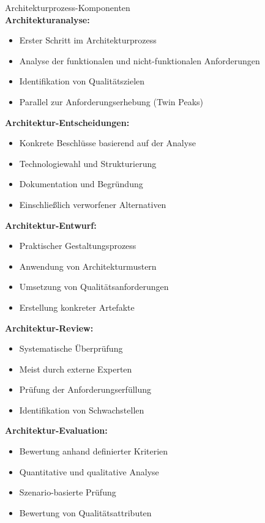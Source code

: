 \begin{definition}{Architekturprozess-Komponenten}\\
\textbf{Architekturanalyse:}
\begin{itemize}
    \item Erster Schritt im Architekturprozess
    \item Analyse der funktionalen und nicht-funktionalen Anforderungen
    \item Identifikation von Qualitätszielen
    \item Parallel zur Anforderungserhebung (Twin Peaks)
\end{itemize}

\textbf{Architektur-Entscheidungen:}
\begin{itemize}
    \item Konkrete Beschlüsse basierend auf der Analyse
    \item Technologiewahl und Strukturierung
    \item Dokumentation und Begründung
    \item Einschließlich verworfener Alternativen
\end{itemize}

\textbf{Architektur-Entwurf:}
\begin{itemize}
    \item Praktischer Gestaltungsprozess
    \item Anwendung von Architekturmustern
    \item Umsetzung von Qualitätsanforderungen
    \item Erstellung konkreter Artefakte
\end{itemize}

\textbf{Architektur-Review:}
\begin{itemize}
    \item Systematische Überprüfung
    \item Meist durch externe Experten
    \item Prüfung der Anforderungserfüllung
    \item Identifikation von Schwachstellen
\end{itemize}

\textbf{Architektur-Evaluation:}
\begin{itemize}
    \item Bewertung anhand definierter Kriterien
    \item Quantitative und qualitative Analyse
    \item Szenario-basierte Prüfung
    \item Bewertung von Qualitätsattributen
\end{itemize}
\end{definition}


